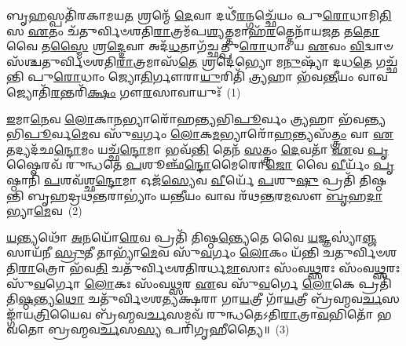{\anuvakamend[{𑌵\-\ul{𑌨}\-𑌸𑍍𑌪𑌤𑌿᳴\-\ul{𑌭𑍍𑌯𑌃} 𑌸𑍍𑌕𑌨𑍍𑌧𑍋॑𑌭𑍍𑌯𑌃 \ul{𑌶𑌿}\-𑌷𑍍𑌟𑌾𑌯᳴ \ul{𑌰𑌿}\-𑌕𑍍𑌤𑌾\-\ul{𑌯} 𑌷𑌟𑍍𑌚᳴𑌤𑍍𑌵𑌾𑌰𑌿𑍞𑌶𑌤𑍍}]}%

\prashnaend[{\-\ul{𑌪𑍍𑌰}\-𑌜𑌵𑌂᳴ \ul{𑌪𑍍𑌰}\-𑌜𑌾𑌪᳴\-\ul{𑌤𑌿}\-𑌰𑍍𑌯𑌦᳴𑌛\-\ul{𑌨𑍍𑌦𑍋}\-𑌮𑌨𑍍𑌤𑍇᳴ 𑌹𑍁𑌵𑍇 𑌸\-\ul{𑌵𑌾}\-𑌹𑌮𑍋𑌷᳴𑌧𑍀\-\ul{𑌭𑍍𑌯𑍋} 𑌦𑍍𑌵𑌿𑌚᳴𑌤𑍍𑌵𑌾𑌰𑌿𑍞𑌶𑌤𑍍॥42॥ \ul{𑌪𑍍𑌰}\-𑌜\-\ul{𑌵}\-\-\ul{𑍞} 𑌸𑌰𑍍𑌵᳴\-\ul{𑌸𑍍𑌮𑍈} 𑌸𑍍𑌵𑌾𑌹𑌾॑॥}]

\setcounter{anuvakam}{0}
𑌬𑍃\-\ul{𑌹}\-𑌸𑍍𑌪𑌤𑌿᳴𑌰𑌕𑌾𑌮𑌯\-\ul{𑌤} 𑌶𑍍𑌰𑌨𑍍𑌮𑍇᳴ \ul{𑌦𑍇}\-𑌵𑌾 𑌦𑌧𑍀᳴\-\ul{𑌰}\-𑌨𑍍𑌗𑌚𑍍𑌛𑍇᳴𑌯𑌂 𑌪𑍁\-\ul{𑌰𑍋}\-𑌧𑌾𑌮𑌿\-\ul{𑌤𑌿} 𑌸 \ul{𑌏}\-𑌤𑌂 𑌚᳴𑌤𑍁𑌰𑍍𑌵𑌿𑍞𑌶𑌤𑌿\-\ul{𑌰𑌾}\-𑌤𑍍𑌰𑌮᳴𑌪\-\ul{𑌶𑍍𑌯}\-𑌤𑍍𑌤𑌮𑌾𑌹᳴\-\ul{𑌰}\-𑌤𑍍𑌤𑍇𑌨𑌾᳴𑌯𑌜\-\ul{𑌤} 𑌤\-\ul{𑌤𑍋} 𑌵𑍈 𑌤\-\ul{𑌸𑍍𑌮𑍈} 𑌶𑍍𑌰\-\ul{𑌦𑍍𑌦𑍇}\-𑌵𑌾 𑌅𑌦᳴\-\ul{𑌧}\-𑌤𑌾𑌗᳴𑌚𑍍𑌛𑌤𑍍𑌪𑍁\-\ul{𑌰𑍋}\-𑌧𑌾𑌂 𑌯 \ul{𑌏}\-𑌵𑌂 \ul{𑌵𑌿}\-𑌦𑍍𑌵𑌾𑍞𑌸᳴𑌶𑍍𑌚𑌤𑍁𑌰𑍍𑌵𑌿𑍞𑌶𑌤𑌿\-\ul{𑌰𑌾}\-𑌤𑍍𑌰𑌮𑌾𑌸᳴\-\ul{𑌤𑍇} 𑌶𑍍𑌰𑌦𑍇॑𑌭𑍍𑌯𑍋 𑌮\-\ul{𑌨𑍁}\-𑌷𑍍𑌯𑌾᳴ 𑌦𑌧\-\ul{𑌤𑍇} 𑌗𑌚𑍍𑌛᳴𑌨𑍍𑌤𑌿 𑌪𑍁\-\ul{𑌰𑍋}\-𑌧𑌾𑌂 𑌜𑍍𑌯𑍋\-\ul{𑌤𑌿}\-𑌰𑍍𑌗𑍗𑌰𑌾\-\ul{𑌯𑍁}\-𑌰𑌿𑌤𑌿᳴ \ul{𑌤𑍍𑌰𑍍𑌯}\-𑌹𑌾 𑌭᳴𑌵\-\ul{𑌨𑍍𑌤𑍀}\-𑌯𑌂 𑌵𑌾𑌵 𑌜𑍍𑌯𑍋𑌤𑌿᳴\-\ul{𑌰}\-𑌨𑍍𑌤𑌰𑌿᳴\-\ul{𑌕𑍍𑌷𑌂} 𑌗𑍗\-\ul{𑌰}\-𑌸𑌾𑌵𑌾𑌯𑍁𑌃᳴~(1)

\-\ul{𑌇}\-𑌮𑌾\-\ul{𑌨𑍇}\-𑌵 \ul{𑌲𑍋}\-𑌕𑌾\-\ul{𑌨}\-𑌭𑍍𑌯𑌾𑌰𑍋᳴𑌹𑌨𑍍𑌤𑍍𑌯𑌭𑌿\-\ul{𑌪𑍂}\-𑌰𑍍𑌵𑌂 \ul{𑌤𑍍𑌰𑍍𑌯}\-𑌹𑌾 𑌭᳴𑌵𑌨𑍍𑌤𑍍𑌯𑌭𑌿\-\ul{𑌪𑍂}\-𑌰𑍍𑌵\-\ul{𑌮𑍇}\-𑌵 𑌸𑍁᳴\-\ul{𑌵}\-𑌰𑍍𑌗𑌂 \ul{𑌲𑍋}\-𑌕\-\ul{𑌮}\-𑌭𑍍𑌯𑌾𑌰𑍋᳴\-\ul{𑌹}\-𑌨𑍍𑌤𑍍𑌯𑌸᳴\-\ul{𑌤𑍍𑌤𑍍𑌰𑌂} 𑌵𑌾 \ul{𑌏}\-𑌤𑌦𑍍𑌯𑌦᳴𑌛\-\ul{𑌨𑍍𑌦𑍋}\-𑌮𑌂 𑌯𑌚𑍍𑌛᳴\-\ul{𑌨𑍍𑌦𑍋}\-𑌮𑌾 𑌭𑌵᳴\-\ul{𑌨𑍍𑌤𑌿} 𑌤𑍇𑌨᳴ \ul{𑌸}\-𑌤𑍍𑌤𑍍𑌰𑌂 \ul{𑌦𑍇}\-𑌵𑌤𑌾᳴ \ul{𑌏}\-𑌵 \ul{𑌪𑍃}\-𑌷𑍍𑌠𑍈𑌰𑌵᳴ 𑌰𑍁𑌨𑍍𑌧𑌤𑍇 \ul{𑌪}\-𑌶𑍂𑌞𑍍𑌛᳴\-\ul{𑌨𑍍𑌦𑍋}\-𑌮𑍈𑌰𑍋\-\ul{𑌜𑍋} 𑌵𑍈 \ul{𑌵𑍀}\-𑌰𑍍𑌯𑌂᳴ \ul{𑌪𑍃}\-𑌷𑍍𑌠𑌾𑌨𑌿᳴ \ul{𑌪}\-𑌶𑌵᳴𑌶𑍍𑌛\-\ul{𑌨𑍍𑌦𑍋}\-𑌮𑌾 𑌓𑌜᳴\-\ul{𑌸𑍍𑌯𑍇}\-𑌵 \ul{𑌵𑍀}\-𑌰𑍍𑌯𑍇᳴ \ul{𑌪}\-𑌶𑍁\-\ul{𑌷𑍁} 𑌪𑍍𑌰𑌤𑌿᳴ 𑌤𑌿𑌷𑍍𑌠𑌨𑍍𑌤𑌿 𑌬𑍃𑌹𑌦𑍍𑌰𑌥\-\ul{𑌨𑍍𑌤}\-𑌰𑌾\-𑌭𑍍𑌯𑌾𑌂॑ 𑌯\-\ul{𑌨𑍍𑌤𑍀}\-𑌯𑌂 𑌵𑌾𑌵 𑌰᳴𑌥\-\ul{𑌨𑍍𑌤}\-𑌰\-\ul{𑌮}\-𑌸𑍗 \ul{𑌬𑍃}\-𑌹\-\ul{𑌦𑌾}\-𑌭𑍍𑌯𑌾\-\ul{𑌮𑍇}\-𑌵~(2)

\-\ul{𑌯}\-𑌨𑍍𑌤𑍍𑌯𑌥𑍋᳴ \ul{𑌅}\-𑌨𑌯𑍋᳴\-\ul{𑌰𑍇}\-𑌵 𑌪𑍍𑌰𑌤𑌿᳴ 𑌤𑌿𑌷𑍍𑌠\-\ul{𑌨𑍍𑌤𑍍𑌯𑍇}\-𑌤𑍇 𑌵𑍈 \ul{𑌯}\-𑌜𑍍𑌞𑌸𑍍𑌯𑌾॑\-\ul{𑌞𑍍𑌜}\-𑌸𑌾𑌯᳴𑌨𑍀 \ul{𑌸𑍍𑌰𑍁}\-𑌤𑍀 𑌤𑌾𑌭𑍍𑌯𑌾᳴\-\ul{𑌮𑍇}\-𑌵 𑌸𑍁᳴\-\ul{𑌵}\-𑌰𑍍𑌗𑌂 \ul{𑌲𑍋}\-𑌕𑌂 𑌯᳴𑌨𑍍𑌤𑌿 𑌚𑌤𑍁𑌰𑍍𑌵𑌿𑍞𑌶𑌤𑌿\-\ul{𑌰𑌾}\-𑌤𑍍𑌰𑍋 𑌭᳴𑌵\-\ul{𑌤𑌿} 𑌚𑌤𑍁᳴𑌰𑍍𑌵𑌿𑍞𑌶𑌤𑌿𑌰𑌰𑍍𑌧\-\ul{𑌮𑌾}\-𑌸𑌾𑌃 𑌸𑌂᳴𑌵\-\ul{𑌥𑍍𑌸}\-𑌰𑌃 𑌸𑌂᳴𑌵\-\ul{𑌥𑍍𑌸}\-𑌰𑌃 𑌸𑍁᳴\-\ul{𑌵}\-𑌰𑍍𑌗𑍋 \ul{𑌲𑍋}\-𑌕𑌃 𑌸𑌂᳴𑌵\-\ul{𑌥𑍍𑌸}\-𑌰 \ul{𑌏}\-𑌵 𑌸𑍁᳴\-\ul{𑌵}\-𑌰𑍍𑌗𑍇 \ul{𑌲𑍋}\-𑌕𑍇 𑌪𑍍𑌰𑌤𑌿᳴ 𑌤𑌿\-\ul{𑌷𑍍𑌠}\-𑌨𑍍𑌤𑍍𑌯\-\ul{𑌥𑍋} 𑌚𑌤𑍁᳴𑌰𑍍𑌵𑌿𑍞𑌶𑌤𑍍𑌯𑌕𑍍𑌷𑌰𑌾 𑌗𑌾\-\ul{𑌯}\-𑌤𑍍𑌰𑍀 𑌗𑌾᳴\-\ul{𑌯}\-𑌤𑍍𑌰𑍀 𑌬𑍍𑌰᳴𑌹𑍍𑌮𑌵\-\ul{𑌰𑍍𑌚}\-𑌸𑌙𑍍𑌗𑌾᳴𑌯\-\ul{𑌤𑍍𑌰𑌿}\-𑌯𑍈𑌵 𑌬𑍍𑌰᳴𑌹𑍍𑌮𑌵\-\ul{𑌰𑍍𑌚}\-𑌸𑌮𑌵᳴ 𑌰𑍁𑌨𑍍𑌧𑌤𑍇\-𑌽𑌤𑌿\-\ul{𑌰𑌾}\-𑌤𑍍𑌰𑌾\-\ul{𑌵}\-𑌭𑌿𑌤𑍋᳴ 𑌭𑌵𑌤𑍋 𑌬𑍍𑌰𑌹𑍍𑌮𑌵\-\ul{𑌰𑍍𑌚}\-𑌸\-\ul{𑌸𑍍𑌯} 𑌪𑌰𑌿᳴𑌗𑍃𑌹𑍀𑌤𑍍𑌯𑍈॥~(3)

{\anuvakamend[{\-\ul{𑌅}\-𑌸𑌾𑌵𑌾𑌯𑍁᳴\-\ul{𑌰𑌾}\-𑌭𑍍𑌯𑌾\-\ul{𑌮𑍇}\-𑌵 𑌪𑌞𑍍𑌚᳴𑌚𑌤𑍍𑌵𑌾𑌰𑌿𑍞𑌶𑌚𑍍𑌚}]}%

